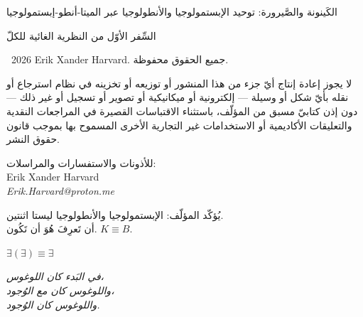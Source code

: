\documentclass[10pt, openany, oneside]{book}
\renewcommand{\small}{\fontsize{9}{11.5}\selectfont}
\begin{document}

\thispagestyle{empty}
\vspace*{\fill}

\begin{center}

الكَينونة والصَّيرورة: توحيد الإبستمولوجيا والأنطولوجيا عبر الميتا-أنطو-إبستمولوجيا

\vspace{1em}

{\small السِّفر الأوّل من النظرية الغائية للكلّ}

\end{center}

\vspace{1.5em}

{\small
\noindent \textcopyright\ 2026 Erik Xander Harvard. جميع الحقوق محفوظة.

\vspace{0.8em}

\noindent لا يجوز إعادة إنتاج أيّ جزء من هذا المنشور أو توزيعه أو تخزينه في نظام استرجاع أو نقله بأيّ شكل أو وسيلة --- إلكترونية أو ميكانيكية أو تصوير أو تسجيل أو غير ذلك --- دون إذن كتابيّ مسبق من المؤلّف، باستثناء الاقتباسات القصيرة في المراجعات النقدية والتعليقات الأكاديمية أو الاستخدامات غير التجارية الأخرى المسموح بها بموجب قانون حقوق النشر.

\vspace{0.8em}

\noindent للأذونات والاستفسارات والمراسلات:\\
Erik Xander Harvard\\
\textit{Erik.Harvard@proton.me}
}

\vspace{1.5em}

\begin{center}
{\small يُؤكّد المؤلّف: الإبستمولوجيا والأنطولوجيا ليستا اثنتين.\\
أن تَعرِفَ هُوَ أن تَكُون. $K \equiv B$.}

\vspace{1em}

$\exists(\exists) \equiv \exists$

\vspace{1em}

\itshape
في البَدء كان اللوغوس،\\
واللوغوس كان مع الوُجود،\\
واللوغوس كان الوُجود.

\end{center}
\end{document}
